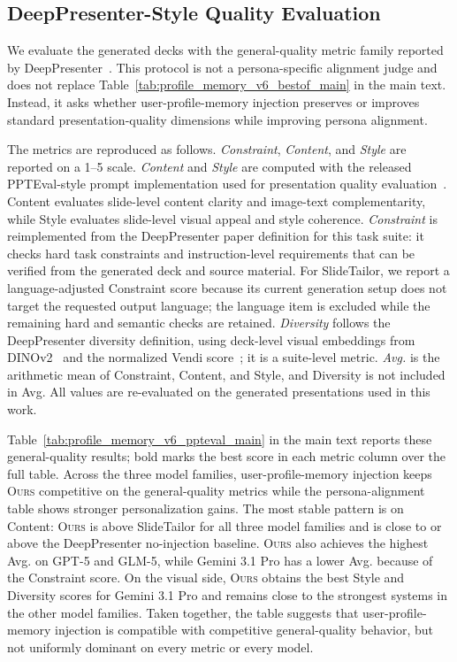 \documentclass{llmxive}
\begin{document}
\subsection{DeepPresenter-Style Quality Evaluation}
\label{app:deeppresenter_quality_eval}

We evaluate the generated decks with the general-quality metric family reported
by DeepPresenter~\citep{zheng2026deeppresenter}. This protocol is not a
persona-specific alignment judge and does not replace
Table~\ref{tab:profile_memory_v6_bestof_main} in the main text. Instead, it
asks whether user-profile-memory injection preserves or improves standard
presentation-quality dimensions while improving persona alignment.

The metrics are reproduced as follows. \textit{Constraint}, \textit{Content},
and \textit{Style} are reported on a 1--5 scale. \textit{Content} and
\textit{Style} are computed with the released PPTEval-style prompt
implementation used for presentation quality evaluation~\citep{zheng2025pptagent}.
Content evaluates slide-level content clarity and image-text complementarity,
while Style evaluates slide-level visual appeal and style coherence.
\textit{Constraint} is reimplemented from the DeepPresenter paper definition
for this task suite: it checks hard task constraints and instruction-level
requirements that can be verified from the generated deck and source material.
For SlideTailor, we report a language-adjusted Constraint score because its
current generation setup does not target the requested output language; the
language item is excluded while the remaining hard and semantic checks are
retained. \textit{Diversity} follows the DeepPresenter diversity definition,
using deck-level visual embeddings from DINOv2~\citep{oquab2023dinov2} and the
normalized Vendi score~\citep{friedman2023vendi}; it is a suite-level metric.
\textit{Avg.} is the arithmetic mean of Constraint, Content, and Style, and
Diversity is not included in Avg. All values are re-evaluated on the generated
presentations used in this work.

Table~\ref{tab:profile_memory_v6_ppteval_main} in the main text reports these
general-quality results; bold marks the best score in each metric column over
the full table. Across the three model families, user-profile-memory injection
keeps \textsc{Ours} competitive on the general-quality metrics while the
persona-alignment table shows stronger personalization gains.
The most stable pattern is on Content: \textsc{Ours} is above SlideTailor for
all three model families and is close to or above the DeepPresenter no-injection
baseline. \textsc{Ours} also achieves the highest Avg. on GPT-5 and GLM-5, while
Gemini 3.1 Pro has a lower Avg. because of the Constraint score. On the visual
side, \textsc{Ours} obtains the best Style and Diversity scores for Gemini 3.1
Pro and remains close to the strongest systems in the other model families.
Taken together, the table suggests that user-profile-memory injection is
compatible with competitive general-quality behavior, but not uniformly dominant
on every metric or every model.
\end{document}
